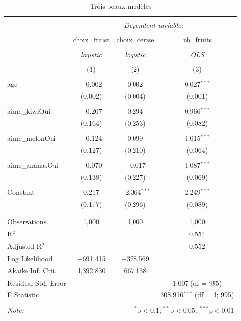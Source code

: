 \documentclass[a4paper, 10pt]{article}\usepackage[]{graphicx}\usepackage[]{xcolor}
\begin{document}
\begin{table}[!htbp] \centering 
  \caption{Trois beaux modèles} 
  \label{} 
\begin{tabular}{@{\extracolsep{5pt}}lccc} 
\\[-1.8ex]\hline 
\hline \\[-1.8ex] 
 & \multicolumn{3}{c}{\textit{Dependent variable:}} \\ 
\cline{2-4} 
\\[-1.8ex] & choix\_fraise & choix\_cerise & nb\_fruits \\ 
\\[-1.8ex] & \textit{logistic} & \textit{logistic} & \textit{OLS} \\ 
\\[-1.8ex] & (1) & (2) & (3)\\ 
\hline \\[-1.8ex] 
 age & $-$0.002 & 0.002 & 0.027$^{***}$ \\ 
  & (0.002) & (0.004) & (0.001) \\ 
  & & & \\ 
 aime\_kiwiOui & $-$0.207 & 0.294 & 0.966$^{***}$ \\ 
  & (0.164) & (0.253) & (0.082) \\ 
  & & & \\ 
 aime\_melonOui & $-$0.124 & 0.099 & 1.015$^{***}$ \\ 
  & (0.127) & (0.210) & (0.064) \\ 
  & & & \\ 
 aime\_ananasOui & $-$0.070 & $-$0.017 & 1.087$^{***}$ \\ 
  & (0.138) & (0.227) & (0.069) \\ 
  & & & \\ 
 Constant & 0.217 & $-$2.364$^{***}$ & 2.249$^{***}$ \\ 
  & (0.177) & (0.296) & (0.089) \\ 
  & & & \\ 
\hline \\[-1.8ex] 
Observations & 1,000 & 1,000 & 1,000 \\ 
R$^{2}$ &  &  & 0.554 \\ 
Adjusted R$^{2}$ &  &  & 0.552 \\ 
Log Likelihood & $-$691.415 & $-$328.569 &  \\ 
Akaike Inf. Crit. & 1,392.830 & 667.138 &  \\ 
Residual Std. Error &  &  & 1.007 (df = 995) \\ 
F Statistic &  &  & 308.916$^{***}$ (df = 4; 995) \\ 
\hline 
\hline \\[-1.8ex] 
\textit{Note:}  & \multicolumn{3}{r}{$^{*}$p$<$0.1; $^{**}$p$<$0.05; $^{***}$p$<$0.01} \\ 
\end{tabular} 
\end{table} 
\end{document}
